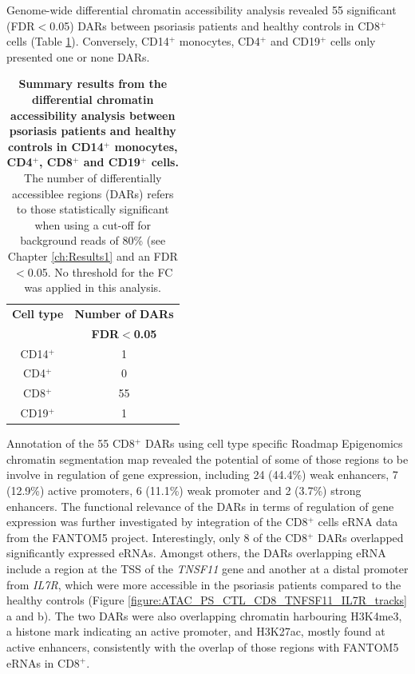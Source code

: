 Genome-wide differential chromatin accessibility analysis revealed 55 significant (FDR$<$0.05) DARs between psoriasis patients and healthy controls in CD8$^+$ cells (Table \ref{tab:ATAC_PS_CTL_differential_analysis_results}). Conversely, CD14$^+$ monocytes, CD4$^+$ and CD19$^+$ cells only presented one or none DARs. 


\begin{table}[htbp]
\centering
\begin{tabular}{@{} c c}
\toprule
\textbf{Cell type}   & \textbf{Number of DARs} \\
                     & \textbf{FDR$<$0.05}     \\
\midrule
\midrule
CD14$^+$             & 1 \\                 
CD4$^+$              & 0 \\
CD8$^+$              & 55 \\
CD19$^+$             & 1 \\
\bottomrule 
\end{tabular}
\medskip %
\caption[Summary results from the differential chromatin accessibility analysis between psoriasis patients and healthy controls in CD14$^+$ monocytes, CD4$^+$, CD8$^+$ and CD19$^+$ cells.]{\textbf{Summary results from the differential chromatin accessibility analysis between psoriasis patients and healthy controls in CD14$^+$ monocytes, CD4$^+$, CD8$^+$ and CD19$^+$ cells.} The number of differentially accessiblee regions (DARs) refers to those statistically significant when using a cut-off for background reads of 80\% (see Chapter \ref{ch:Results1} and an FDR$<$0.05. No threshold for the FC was applied in this analysis.}
\label{tab:ATAC_PS_CTL_differential_analysis_results}
\end{table}
\bigskip %


Annotation of the 55 CD8$^+$ DARs using cell type specific Roadmap Epigenomics chromatin segmentation map revealed the potential of some of those regions to be involve in regulation of gene expression, including 24 (44.4\%) weak enhancers, 7 (12.9\%) active promoters, 6 (11.1\%) weak promoter and 2 (3.7\%) strong enhancers. The functional relevance of the DARs in terms of regulation of gene expression was further investigated by integration of the CD8$^+$ cells eRNA data from the FANTOM5 project. Interestingly, only 8 of the CD8$^+$ DARs overlapped significantly expressed eRNAs. Amongst others, the DARs overlapping eRNA include a region at the TSS of the \textit{TNSF11} gene and another at a distal promoter from \textit{IL7R}, which were more accessible in the psoriasis patients compared to the healthy controls (Figure \ref{figure:ATAC_PS_CTL_CD8_TNFSF11_IL7R_tracks} a and b). The two DARs were also overlapping chromatin harbouring H3K4me3, a histone mark indicating an active promoter, and H3K27ac, mostly found at active enhancers, consistently with the overlap of those regions with FANTOM5 eRNAs in CD8$^+$.

